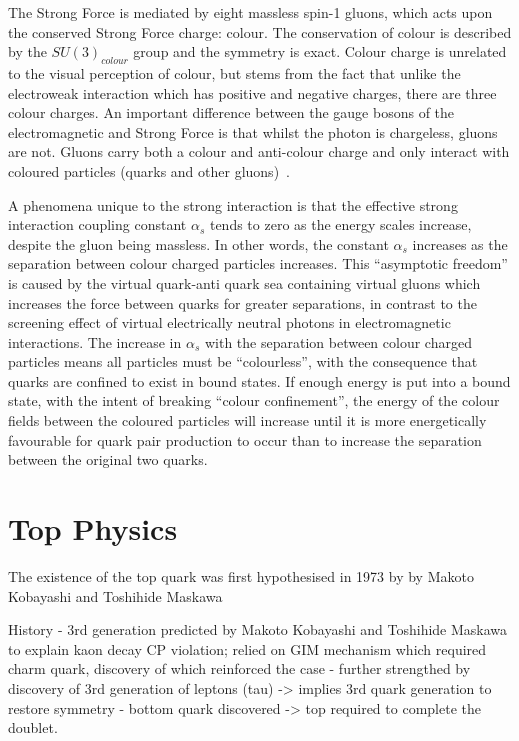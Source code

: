 The Strong Force is mediated by eight massless spin-1 gluons, which acts upon the conserved Strong Force charge: colour\cite{ElectroweakStrong}. 
The conservation of colour is described by the $SU(3)_{colour}$ group and the symmetry is exact. 
Colour charge is unrelated to the visual perception of colour, but stems from the fact that unlike the electroweak interaction which has positive and negative charges, there are three colour charges. 
An important difference between the gauge bosons of the electromagnetic and Strong Force is that whilst the photon is chargeless, gluons are not. 
Gluons carry both a colour and anti-colour charge and only interact with coloured particles (quarks and other gluons)~\cite{ElectroweakStrong}. 

A phenomena unique to the strong interaction is that the effective strong interaction coupling constant $\alpha_{s}$ tends to zero as the energy scales increase, despite the gluon being massless. 
In other words, the constant $\alpha_{s}$ increases as the separation between colour charged particles increases. 
This ``asymptotic freedom'' is caused by the virtual quark-anti quark sea containing virtual gluons which increases the force between quarks for greater separations, in contrast to the screening effect of virtual electrically neutral photons in electromagnetic interactions. 
The increase in $\alpha_{s}$ with the separation between colour charged particles means all particles must be ``colourless'', with the consequence that quarks are confined to exist in bound states\cite{ElectroweakStrong}. 
If enough energy is put into a bound state, with the intent of breaking ``colour confinement'', the energy of the colour fields between the coloured particles will increase until it is more energetically favourable for quark pair production to occur than to increase the separation between the original two quarks\cite{Griffiths}. 



\section{Top Physics}\label{sec:top-physics}
The existence of the top quark was first hypothesised in 1973 by by Makoto Kobayashi and Toshihide Maskawa

History - 3rd generation predicted by Makoto Kobayashi and Toshihide Maskawa to explain kaon decay CP violation; relied on GIM mechanism which required charm quark, discovery of which reinforced the case
- further strengthed by discovery of 3rd generation of leptons (tau) -> implies 3rd quark generation to restore symmetry
- bottom quark discovered -> top required to complete the doublet.

